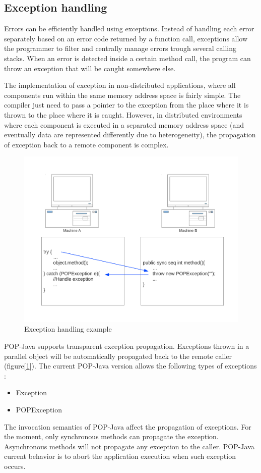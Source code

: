 \subsection{Exception handling}
\label{exception}
Errors can be efficiently handled using exceptions. Instead of handling each error separately based on an error code returned by a function call, exceptions allow the programmer to filter and centrally manage errors trough several calling stacks. When an error is detected inside a certain method call, the program can throw an exception that will be caught somewhere else.\s

The implementation of exception in non-distributed applications, where all components run within the same memory address space is fairly simple. The compiler just need to pass a pointer to the exception from the place where it is thrown to the place where it is caught.  However, in distributed environments where each component is executed in a separated memory address space (and eventually data are represented differently due to heterogeneity), the propagation of exception back to a remote component is complex.

\begin{figure}[ht]
\caption{Exception handling example}
\center
\label{fig:exception}
\includegraphics[scale=0.3]{exception.pdf}
\end{figure}

POP-Java supports transparent exception propagation. Exceptions thrown in a parallel object will be automatically propagated back to the remote caller (figure[\ref{fig:exception}]). The current POP-Java version allows the following types of exceptions : 
\begin{itemize}
\item Exception
\item POPException
\end{itemize}

The invocation semantics of POP-Java affect the propagation of exceptions. For the moment, only synchronous methods can propagate the exception. Asynchronous methods will not propagate any exception to the caller. POP-Java current behavior is to abort the application execution when such exception occurs. 


